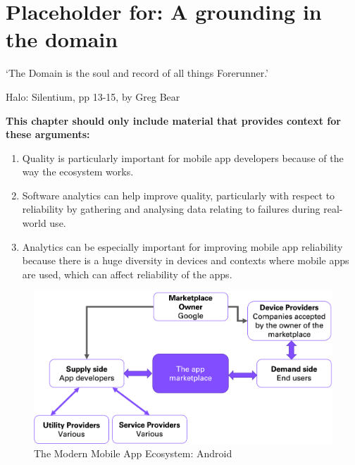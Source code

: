 \chapter{Placeholder for: A grounding in the domain}\label{chapter-preparing-the-ground}%

\epigraph{`The Domain is the soul and record of all things Forerunner.'}{Halo: Silentium, pp 13-15, by Greg Bear}

\bigskip

\begin{kaobox}[frametitle=Context for this chapter]
\textbf{This chapter should only include material that provides context for these arguments:}
\begin{enumerate}[start=3]
    \item Quality is particularly important for mobile app developers because of the way the ecosystem works.
    \item Software analytics can help improve quality, particularly with respect to reliability by gathering and analysing data relating to failures during real-world use.
    \item Analytics can be especially important for improving mobile app reliability because there is a huge diversity in devices and contexts where mobile apps are used, which can affect reliability of the apps.
\end{enumerate}
\end{kaobox}

\begin{figure}[b!]
    \centering
    \includegraphics[width=0.9\linewidth]{images/my/android-app-ecosystem-main-players.png}
    \caption{The Modern Mobile App Ecosystem: Android}
    \label{fig:my_modern-mobile-app-ecosystem}
\end{figure}


